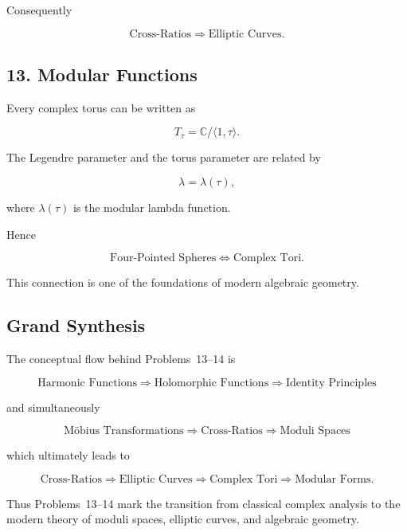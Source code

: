 \documentclass[12pt,a4paper]{article}
\theoremstyle{notespace}
\begin{document}
Consequently

\[
\boxed{
	\text{Cross-Ratios}
	\Longrightarrow
	\text{Elliptic Curves}.
}
\]

\bigskip

\subsection{13. Modular Functions}

Every complex torus can be written as

\[
T_\tau
=
\mathbb C/\langle1,\tau\rangle.
\]

The Legendre parameter and the torus parameter are related by

\[
\lambda
=
\lambda(\tau),
\]

where \(\lambda(\tau)\) is the modular lambda function.

Hence

\[
\boxed{
	\text{Four-Pointed Spheres}
	\Longleftrightarrow
	\text{Complex Tori}.
}
\]

This connection is one of the foundations of modern algebraic geometry.

\bigskip

\subsection{Grand Synthesis}

The conceptual flow behind Problems~13--14 is

\[
\boxed{
	\text{Harmonic Functions}
	\Longrightarrow
	\text{Holomorphic Functions}
	\Longrightarrow
	\text{Identity Principles}
}
\]

and simultaneously

\[
\boxed{
	\text{Möbius Transformations}
	\Longrightarrow
	\text{Cross-Ratios}
	\Longrightarrow
	\text{Moduli Spaces}
}
\]

which ultimately leads to

\[
\boxed{
	\text{Cross-Ratios}
	\Longrightarrow
	\text{Elliptic Curves}
	\Longrightarrow
	\text{Complex Tori}
	\Longrightarrow
	\text{Modular Forms}.
}
\]

Thus Problems~13--14 mark the transition from classical complex analysis to the modern theory of moduli spaces, elliptic curves, and algebraic geometry.	
	
\end{document}
